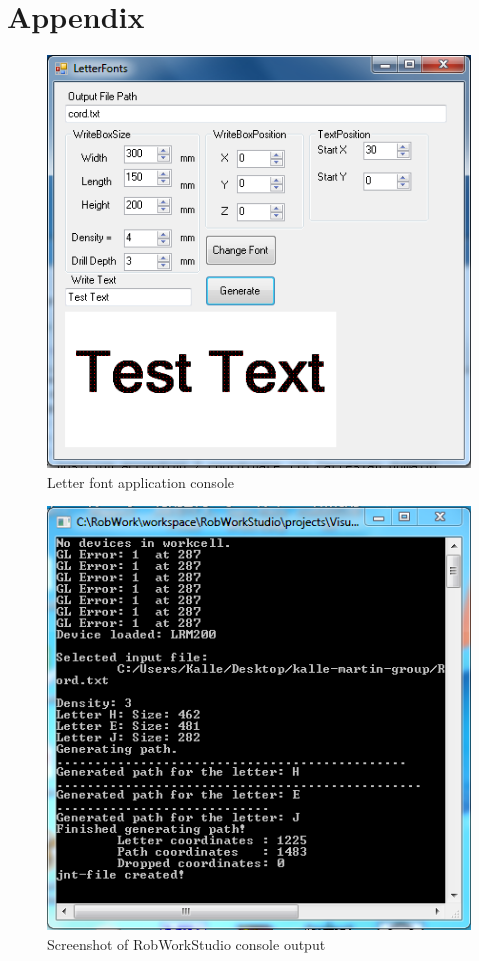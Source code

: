 \newpage
\section{Appendix}
\label{sec:append}

\begin{figure}[H]
  \centering
  \includegraphics[scale= 0.6]{source/LetterFontsFinal.png}
  \caption{Letter font application console}
  \label{fig:LetterFontsFinal}
\end{figure}

\begin{figure}[H]
  \centering
  \includegraphics[scale= 0.7]{source/RobWorkStudioPlugin2.png}
  \caption{Screenshot of RobWorkStudio console output}
  \label{fig:RobWCon}
\end{figure}


